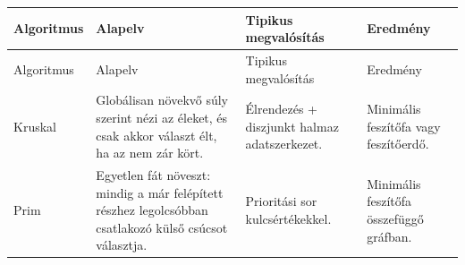 \begingroup
\setlength{\tabcolsep}{4pt}
\begin{longtable}{L{0.22\textwidth}L{0.33\textwidth}L{0.22\textwidth}L{0.13\textwidth}}
\toprule
Algoritmus & Alapelv & Tipikus megvalósítás & Eredmény \\
\midrule
\endfirsthead
\toprule
Algoritmus & Alapelv & Tipikus megvalósítás & Eredmény \\
\midrule
\endhead
Kruskal & Globálisan növekvő súly szerint nézi az éleket, és csak akkor választ élt, ha az nem zár kört. & Élrendezés + diszjunkt halmaz adatszerkezet. & Minimális feszítőfa vagy feszítőerdő. \\
Prim & Egyetlen fát növeszt: mindig a már felépített részhez legolcsóbban csatlakozó külső csúcsot választja. & Prioritási sor kulcsértékekkel. & Minimális feszítőfa összefüggő gráfban. \\
\bottomrule
\end{longtable}
\endgroup

